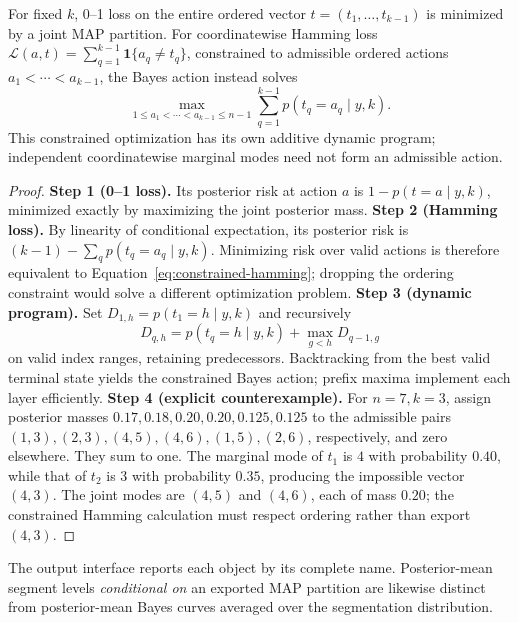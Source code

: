 \begin{proposition}
\label{prop:loss-bayes-action}
For fixed $k$, 0--1 loss on the entire ordered vector $t=(t_1,\ldots,t_{k-1})$ is minimized by a joint MAP partition. For coordinatewise Hamming loss $\mathcal L(a,t)=\sum_{q=1}^{k-1}\mathbf1\{a_q\ne t_q\}$, constrained to admissible ordered actions $a_1<\cdots<a_{k-1}$, the Bayes action instead solves
\begin{equation}
\max_{1\le a_1<\cdots<a_{k-1}\le n-1}
\sum_{q=1}^{k-1}p(t_q=a_q\mid y,k).
\label{eq:constrained-hamming}
\end{equation}
This constrained optimization has its own additive dynamic program; independent coordinatewise marginal modes need not form an admissible action.
\end{proposition}
\begin{proof}
\textbf{Step 1 (0--1 loss).} Its posterior risk at action $a$ is $1-p(t=a\mid y,k)$, minimized exactly by maximizing the joint posterior mass.
\textbf{Step 2 (Hamming loss).} By linearity of conditional expectation, its posterior risk is $(k-1)-\sum_qp(t_q=a_q\mid y,k)$. Minimizing risk over valid actions is therefore equivalent to Equation~\eqref{eq:constrained-hamming}; dropping the ordering constraint would solve a different optimization problem.
\textbf{Step 3 (dynamic program).} Set $D_{1,h}=p(t_1=h\mid y,k)$ and recursively
\[
D_{q,h}=p(t_q=h\mid y,k)+\max_{g<h}D_{q-1,g}
\]
on valid index ranges, retaining predecessors. Backtracking from the best valid terminal state yields the constrained Bayes action; prefix maxima implement each layer efficiently.
\textbf{Step 4 (explicit counterexample).} For $n=7,k=3$, assign posterior masses $0.17,0.18,0.20,0.20,0.125,0.125$ to the admissible pairs $(1,3),(2,3),(4,5),(4,6),(1,5),(2,6)$, respectively, and zero elsewhere. They sum to one. The marginal mode of $t_1$ is $4$ with probability $0.40$, while that of $t_2$ is $3$ with probability $0.35$, producing the impossible vector $(4,3)$. The joint modes are $(4,5)$ and $(4,6)$, each of mass $0.20$; the constrained Hamming calculation must respect ordering rather than export $(4,3)$.
\end{proof}

The output interface reports each object by its complete name. Posterior-mean segment levels \emph{conditional on} an exported MAP partition are likewise distinct from posterior-mean Bayes curves averaged over the segmentation distribution.
